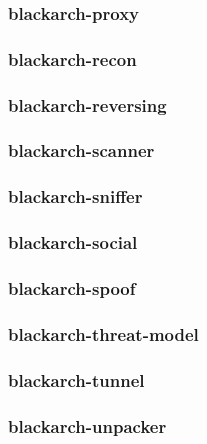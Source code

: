\documentclass[a4paper, oneside, 11pt]{book}
\begin{document}
\subsubsection{blackarch-proxy}



\subsubsection{blackarch-recon}



\subsubsection{blackarch-reversing}



\subsubsection{blackarch-scanner}



\subsubsection{blackarch-sniffer}



\subsubsection{blackarch-social}



\subsubsection{blackarch-spoof}



\subsubsection{blackarch-threat-model}



\subsubsection{blackarch-tunnel}



\subsubsection{blackarch-unpacker}
\end{document}

